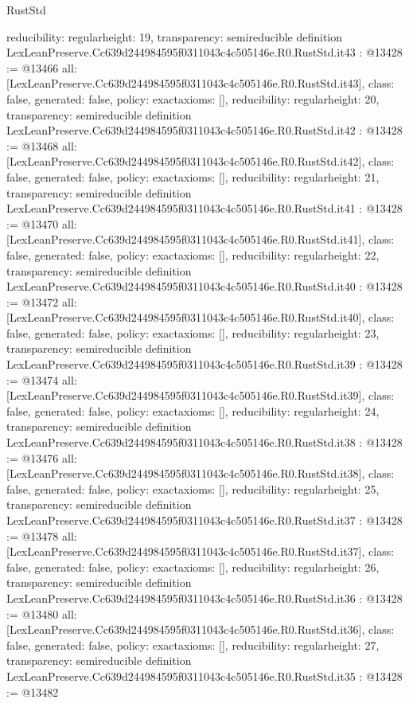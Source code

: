 \begin{lexlean}{RustStd}
\begin{coremodule}
{  reducibility: regular{height: 19},
  transparency: semireducible
}
definition LexLeanPreserve.Cc639d244984595f0311043c4c505146e.R0.RustStd.it43 : @13428 := @13466 {
  all: [LexLeanPreserve.Cc639d244984595f0311043c4c505146e.R0.RustStd.it43],
  class: false,
  generated: false,
  policy: exact{axioms: []},
  reducibility: regular{height: 20},
  transparency: semireducible
}
definition LexLeanPreserve.Cc639d244984595f0311043c4c505146e.R0.RustStd.it42 : @13428 := @13468 {
  all: [LexLeanPreserve.Cc639d244984595f0311043c4c505146e.R0.RustStd.it42],
  class: false,
  generated: false,
  policy: exact{axioms: []},
  reducibility: regular{height: 21},
  transparency: semireducible
}
definition LexLeanPreserve.Cc639d244984595f0311043c4c505146e.R0.RustStd.it41 : @13428 := @13470 {
  all: [LexLeanPreserve.Cc639d244984595f0311043c4c505146e.R0.RustStd.it41],
  class: false,
  generated: false,
  policy: exact{axioms: []},
  reducibility: regular{height: 22},
  transparency: semireducible
}
definition LexLeanPreserve.Cc639d244984595f0311043c4c505146e.R0.RustStd.it40 : @13428 := @13472 {
  all: [LexLeanPreserve.Cc639d244984595f0311043c4c505146e.R0.RustStd.it40],
  class: false,
  generated: false,
  policy: exact{axioms: []},
  reducibility: regular{height: 23},
  transparency: semireducible
}
definition LexLeanPreserve.Cc639d244984595f0311043c4c505146e.R0.RustStd.it39 : @13428 := @13474 {
  all: [LexLeanPreserve.Cc639d244984595f0311043c4c505146e.R0.RustStd.it39],
  class: false,
  generated: false,
  policy: exact{axioms: []},
  reducibility: regular{height: 24},
  transparency: semireducible
}
definition LexLeanPreserve.Cc639d244984595f0311043c4c505146e.R0.RustStd.it38 : @13428 := @13476 {
  all: [LexLeanPreserve.Cc639d244984595f0311043c4c505146e.R0.RustStd.it38],
  class: false,
  generated: false,
  policy: exact{axioms: []},
  reducibility: regular{height: 25},
  transparency: semireducible
}
definition LexLeanPreserve.Cc639d244984595f0311043c4c505146e.R0.RustStd.it37 : @13428 := @13478 {
  all: [LexLeanPreserve.Cc639d244984595f0311043c4c505146e.R0.RustStd.it37],
  class: false,
  generated: false,
  policy: exact{axioms: []},
  reducibility: regular{height: 26},
  transparency: semireducible
}
definition LexLeanPreserve.Cc639d244984595f0311043c4c505146e.R0.RustStd.it36 : @13428 := @13480 {
  all: [LexLeanPreserve.Cc639d244984595f0311043c4c505146e.R0.RustStd.it36],
  class: false,
  generated: false,
  policy: exact{axioms: []},
  reducibility: regular{height: 27},
  transparency: semireducible
}
definition LexLeanPreserve.Cc639d244984595f0311043c4c505146e.R0.RustStd.it35 : @13428 := @13482 {
}
\end{coremodule}
\end{lexlean}

